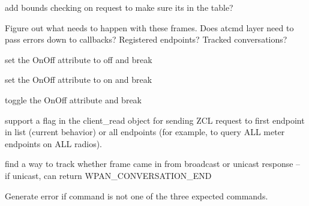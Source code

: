 
\begin{DoxyRefList}
\item[\label{todo__todo000009}%
\Hypertarget{todo__todo000009}%
Global \hyperlink{group__xbee__atcmd_ga899d5ef84ca5790c3c76b965f88874e0}{\+\_\+xbee\+\_\+cmd\+\_\+release\+\_\+request} (\hyperlink{structxbee__cmd__request__t}{xbee\+\_\+cmd\+\_\+request\+\_\+t} F\+AR $\ast$request)]add bounds checking on request to make sure it\textquotesingle{}s in the table?  
\item[\label{todo__todo000030}%
\Hypertarget{todo__todo000030}%
Global \hyperlink{group__xbee__wpan_ga56d68291ceee384fbd8a5833eb91182c}{\+\_\+xbee\+\_\+handle\+\_\+transmit\+\_\+status} (\hyperlink{structxbee__dev__t}{xbee\+\_\+dev\+\_\+t} $\ast$xbee, const void F\+AR $\ast$payload, uint16\+\_\+t length, void F\+AR $\ast$context)]Figure out what needs to happen with these frames. Does atcmd layer need to pass errors down to callbacks? Registered endpoints? Tracked conversations?  
\item[\label{todo__todo000017}%
\Hypertarget{todo__todo000017}%
Global \hyperlink{group__zcl__onoff_gae7dc87cd27559c9ae0499ac542ab6107}{\+\_\+zcl\+\_\+onoff\+\_\+handler} (const \hyperlink{structwpan__envelope__t}{wpan\+\_\+envelope\+\_\+t} F\+AR $\ast$envelope, void F\+AR $\ast$context)]set the On\+Off attribute to off and break 

set the On\+Off attribute to on and break 

toggle the On\+Off attribute and break  
\item[\label{todo__todo000013}%
\Hypertarget{todo__todo000013}%
Global \hyperlink{group__zcl__client_ga15f191f3166c71f3f436b2a32d108a9f}{\+\_\+zcl\+\_\+send\+\_\+read\+\_\+from\+\_\+zdo\+\_\+match} (\hyperlink{structwpan__conversation__t}{wpan\+\_\+conversation\+\_\+t} F\+AR $\ast$conversation, const \hyperlink{structwpan__envelope__t}{wpan\+\_\+envelope\+\_\+t} F\+AR $\ast$envelope)]support a flag in the client\+\_\+read object for sending Z\+CL request to first endpoint in list (current behavior) or all endpoints (for example, to query A\+LL meter endpoints on A\+LL radios).

find a way to track whether frame came in from broadcast or unicast response -- if unicast, can return W\+P\+A\+N\+\_\+\+C\+O\+N\+V\+E\+R\+S\+A\+T\+I\+O\+N\+\_\+\+E\+ND  
\item[\label{todo__todo000021}%
\Hypertarget{todo__todo000021}%
Global \hyperlink{group__zcl_gaff3abb5d2022101c2873e7a8e8b027e5}{\+\_\+zcl\+\_\+write\+\_\+attributes} (\hyperlink{structzcl__command__t}{zcl\+\_\+command\+\_\+t} $\ast$cmd)]Generate error if command is not one of the three expected commands.


\end{DoxyRefList}
